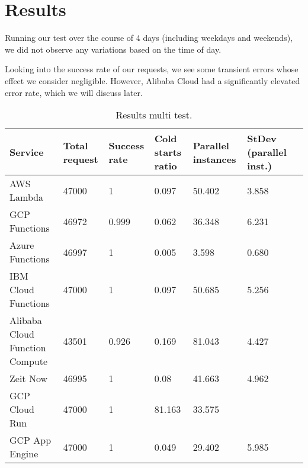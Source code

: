 \documentclass[11pt]{article}
\begin{document}
\section{Results}

Running our test over the course of 4 days (including weekdays and weekends),
we did not observe any variations based on the time of day.



Looking into the success rate of our requests,
we see some transient errors whose effect we consider negligible.
However, Alibaba Cloud had a significantly elevated error rate,
which we will discuss later.

\begin{table}
\centering
 \begin{tabularx}{1\textwidth}{p{4cm} X X X X X X}
 \textbf{Service} & \textbf{Total request} & \textbf{Success rate} & \textbf{Cold starts ratio} & \textbf{Parallel instances} & \textbf{StDev (parallel inst.)} \\
 \hline
 \hline
 AWS Lambda & 47000 & 1 & 0.097 & 50.402 & 3.858\\
 \hline
 GCP Functions & 46972 & 0.999 & 0.062 & 36.348 & 6.231\\
 \hline
 Azure Functions & 46997 & 1 & 0.005 & 3.598 & 0.680\\
 \hline
 IBM Cloud Functions & 47000 & 1 & 0.097 & 50.685 & 5.256\\
 \hline
 Alibaba Cloud Function Compute & 43501 & 0.926 & 0.169 & 81.043 & 4.427\\
 \hline
 Zeit Now & 46995  & 1 & 0.08 & 41.663 & 4.962\\
 \hline
 GCP Cloud Run & 47000 & 1 & 81.163 & 33.575\\
 \hline
 GCP App Engine & 47000 & 1 & 0.049 & 29.402 & 5.985\\
 \hline

\end{tabularx}
\caption{Results multi test.}
\label{Tab:multi}
\end{table}
\end{document}
